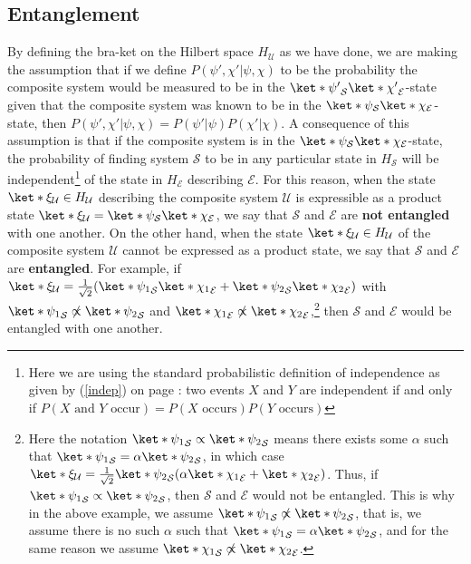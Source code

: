 \documentclass[12pt]{report}
\begin{document}
    \subsection{Entanglement}  
     By defining the bra-ket on the Hilbert space $H_\mathcal{U}$ as we have done, we are making the assumption that if we define $P(\psi',\chi'|\psi,\chi)$ to be the probability the composite system would be measured to be in the $\ket*{\psi'}_\mathcal{S}\ket*{\chi'}_\mathcal{E}$-state given that the composite system was known to be in the $\ket*{\psi}_\mathcal{S}\ket*{\chi}_\mathcal{E}$-state, then $P(\psi',\chi'|\psi,\chi)=P(\psi'|\psi)P(\chi'|\chi).$ A consequence of this assumption is that if the composite system is in the $\ket*{\psi}_\mathcal{S}\ket*{\chi}_\mathcal{E}$-state, the probability of finding system $\mathcal{S}$ to be in any particular state in $H_\mathcal{S}$ will be independent\footnote{Here we are using the standard probabilistic definition of independence as given by (\ref{indep}) on page \pageref{indep}: two events $X$ and $Y$ are independent if and only if $P(X \text{ and } Y\text{ occur})=P(X\text{ occurs})P(Y\text{ occurs})$} of the state in $H_\mathcal{E}$ describing $\mathcal{E}$. For this reason, when the state $\ket*{\xi}_\mathcal{U}\in H_\mathcal{U}$ describing the composite system $\mathcal{U}$ is expressible as a product state $\ket*{\xi}_\mathcal{U}=\ket*{\psi}_\mathcal{S}\ket*{\chi}_\mathcal{E}$,  we say that $\mathcal{S}$ and $\mathcal{E}$ are \textbf{not entangled} with one another. On the other hand, when  the state $\ket*{\xi}_\mathcal{U}\in H_\mathcal{U}$ of the composite system $\mathcal{U}$ cannot be expressed as a product state, we say that $\mathcal{S}$ and $\mathcal{E}$ are \textbf{entangled}.
       For example, if $\ket*{\xi}_\mathcal{U}=\frac{1}{\sqrt{2}}(\ket*{\psi_1}_\mathcal{S}\ket*{\chi_1}_\mathcal{E}+\ket*{\psi_2}_\mathcal{S}\ket*{\chi_2}_\mathcal{E})$ with $\ket*{\psi_1}_\mathcal{S}\not\propto\ket*{\psi_2}_\mathcal{S}$ and $\ket*{\chi_1}_\mathcal{E}\not\propto\ket*{\chi_2}_\mathcal{E}$,\footnote{Here the notation $\ket*{\psi_1}_\mathcal{S}\propto\ket*{\psi_2}_\mathcal{S}$ means there exists some $\alpha$ such that $\ket*{\psi_1}_\mathcal{S}=\alpha\ket*{\psi_2}_\mathcal{S}$, in which case $\ket*{\xi}_\mathcal{U}=\frac{1}{\sqrt{2}}\ket*{\psi_2}_\mathcal{S}(\alpha\ket*{\chi_1}_\mathcal{E}+\ket*{\chi_2}_\mathcal{E})$. Thus, if  $\ket*{\psi_1}_\mathcal{S}\propto\ket*{\psi_2}_\mathcal{S}$, then  $\mathcal{S}$ and $\mathcal{E}$   %
%
       would not be entangled. This is why in the above example, we assume $\ket*{\psi_1}_\mathcal{S}\not\propto\ket*{\psi_2}_\mathcal{S}$, that is, we assume there is no such $\alpha$ such that $\ket*{\psi_1}_\mathcal{S}=\alpha\ket*{\psi_2}_\mathcal{S}$, and for the same reason we assume $\ket*{\chi_1}_\mathcal{S}\not\propto\ket*{\chi_2}_\mathcal{E}$.} then $\mathcal{S}$ and $\mathcal{E}$ would be entangled with one another.
      
\end{document}
